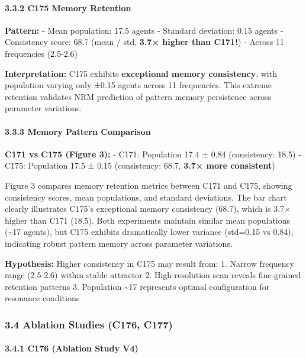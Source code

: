 \documentclass[
]{article}
\begin{document}
\paragraph{3.3.2 C175 Memory Retention}\label{c175-memory-retention}

\textbf{Pattern:} - Mean population: 17.5 agents - Standard deviation:
0.15 agents - Consistency score: 68.7 (mean / std, \textbf{3.7× higher
than C171!}) - Across 11 frequencies (2.5-2.6)

\textbf{Interpretation:} C175 exhibits \textbf{exceptional memory
consistency}, with population varying only ±0.15 agents across 11
frequencies. This extreme retention validates NRM prediction of pattern
memory persistence across parameter variations.

\paragraph{3.3.3 Memory Pattern
Comparison}\label{memory-pattern-comparison}

\textbf{C171 vs C175 (Figure 3):} - C171: Population 17.4 ± 0.84
(consistency: 18.5) - C175: Population 17.5 ± 0.15 (consistency: 68.7,
\textbf{3.7× more consistent})

Figure 3 compares memory retention metrics between C171 and C175,
showing consistency scores, mean populations, and standard deviations.
The bar chart clearly illustrates C175's exceptional memory consistency
(68.7), which is 3.7× higher than C171 (18.5). Both experiments maintain
similar mean populations (\textasciitilde17 agents), but C175 exhibits
dramatically lower variance (std=0.15 vs 0.84), indicating robust
pattern memory across parameter variations.

\textbf{Hypothesis:} Higher consistency in C175 may result from: 1.
Narrow frequency range (2.5-2.6) within stable attractor 2.
High-resolution scan reveals fine-grained retention patterns 3.
Population \textasciitilde17 represents optimal configuration for
resonance conditions

\subsubsection{3.4 Ablation Studies (C176,
C177)}\label{ablation-studies-c176-c177}

\paragraph{3.4.1 C176 (Ablation Study V4)}\label{c176-ablation-study-v4}
\end{document}
